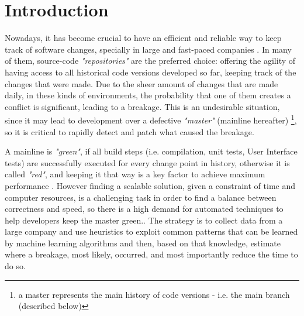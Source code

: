 \newcommand{\SubItem}[1]{
	{\setlength\itemindent{15pt} \item[-] #1}
}

\chapter{Introduction}
\label{chapter:introduction}

Nowadays, it has become crucial to have an efficient and reliable way to keep track of software changes, specially in large and fast-paced companies \cite{Uber}. In many of them, source-code \textit{"repositories"} are the preferred choice: offering the agility of having access to all historical code versions developed so far, keeping track of the changes that were made. Due to the sheer amount of changes that are made daily, in these kinds of environments, the probability that one of them creates a conflict is significant, leading to a breakage. This is an undesirable situation, since it may lead to development over a defective \textit{"master"} (mainline hereafter) \footnote{a master represents the main history of code versions - i.e. the main branch (described below)  }, so it is critical to rapidly detect and patch what caused the breakage.

A mainline is \textit{"green"}, if all build steps (i.e. compilation, unit tests, User Interface tests) are successfully executed for every change point in history, otherwise it is called \textit{"red"}, and keeping it that way is a key factor to achieve maximum performance \cite{Uber}. However finding a scalable solution, given a constraint of time and computer resources, is a challenging task in order to find a balance between correctness and speed, so there is a high demand for automated techniques to help developers keep the master green.\cite{Ziftci}. The strategy is to collect data from a large company and use heuristics to exploit common patterns that can be learned by machine learning algorithms and then, based on that knowledge, estimate where a breakage, most likely, occurred, and most importantly reduce the time to do so.

